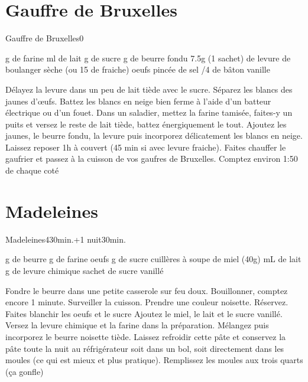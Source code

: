 {%
\section{Gauffre de Bruxelles}
\begin{recette}{Gauffre de Bruxelles}{0}{}{}
\begin{ingredients}[12 gauffres]
 g de farine
 ml de lait
 g de sucre
 g de beurre fondu
\ingredient 7.5g (1 sachet) de levure de boulanger sèche (ou 15 de fraiche)
 oeufs
 pincée de sel
/4 de bâton vanille
\end{ingredients}

\begin{preparation}
\etape Délayez la levure dans un peu de lait tiède avec le sucre.
\etape Séparez les blancs des jaunes d'œufs. Battez les blancs en neige bien ferme à l'aide d'un batteur électrique ou d'un fouet.
\etape Dans un saladier, mettez la farine tamisée, faites-y un puits et versez le reste de lait tiède, battez énergiquement le tout. Ajoutez les jaunes, le beurre fondu, la levure puis incorporez délicatement les blancs en neige.
\etape Laissez reposer 1h à couvert (45 min si avec levure fraiche).
\etape Faites chauffer le gaufrier et passez à la cuisson de vos gaufres de Bruxelles. Comptez environ 1:50 de chaque coté
\end{preparation}
\end{recette}

\section{Madeleines}
\begin{recette}{Madeleines}{4}{30min.+1 nuit}{30min.}
\begin{ingredients}[36 madeleines]
 g de beurre
 g de farine
 oeufs
 g de sucre
 cuillères à soupe de miel (40g)
 mL de lait
 g de levure chimique
 sachet de sucre vanillé
\end{ingredients}

\begin{preparation}
\etape Fondre le beurre dans une petite casserole sur feu doux. Bouillonner, comptez encore 1 minute. Surveiller la cuisson. Prendre une couleur noisette. Réservez.
\etape Faites blanchir les oeufs et le sucre
\etape Ajoutez le miel, le lait et le sucre vanillé. Versez la levure chimique et la farine dans la préparation.
\etape Mélangez puis incorporez le beurre noisette tiède. Laissez refroidir cette pâte et conservez la pâte toute la nuit au réfrigérateur soit dans un bol, soit directement dans les moules (ce qui est mieux et plus pratique). Remplissez les moules aux trois quarts (ça gonfle)
\end{preparation}


\end{recette}}

